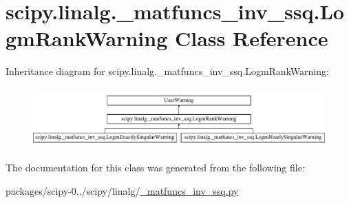 \hypertarget{classscipy_1_1linalg_1_1__matfuncs__inv__ssq_1_1LogmRankWarning}{}\section{scipy.\+linalg.\+\_\+matfuncs\+\_\+inv\+\_\+ssq.\+Logm\+Rank\+Warning Class Reference}
\label{classscipy_1_1linalg_1_1__matfuncs__inv__ssq_1_1LogmRankWarning}
Inheritance diagram for scipy.\+linalg.\+\_\+matfuncs\+\_\+inv\+\_\+ssq.\+Logm\+Rank\+Warning\+:\begin{figure}[H]
\begin{center}
\leavevmode
\includegraphics[height=2.314050cm]{classscipy_1_1linalg_1_1__matfuncs__inv__ssq_1_1LogmRankWarning}
\end{center}
\end{figure}


The documentation for this class was generated from the following file\+:\begin{DoxyCompactItemize}
\item 
packages/scipy-\/0../scipy/linalg/\hyperlink{__matfuncs__inv__ssq_8py}{\+\_\+matfuncs\+\_\+inv\+\_\+ssq.\+py}\end{DoxyCompactItemize}
